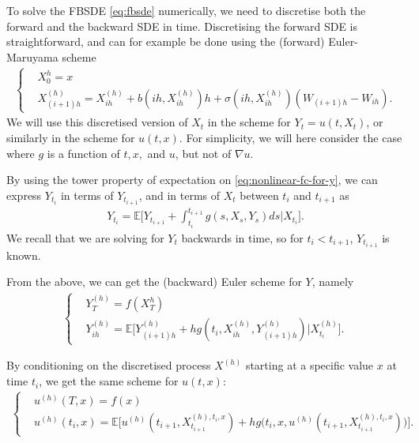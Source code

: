 \documentclass{article}  %
\begin{document}
To solve the FBSDE \autoref{eq:fbsde} numerically, we need to discretise both the forward and the backward SDE in time. Discretising the forward SDE is straightforward, and can for example be done using the (forward) Euler-Maruyama scheme
%
\begin{align} 
    \begin{cases}
    &X_0^{h} = x\\
    &X_{(i+1)h}^{(h)} = X_{ih}^{(h)} + b(ih,X_{ih}^{(h)}) h + \sigma(ih,X_{ih}^{(h)})(W_{(i+1)h}-W_{ih}).
    \end{cases}
\end{align}
%
We will use this discretised version of $X_t$ in the scheme for $Y_t=u(t,X_t)$, or similarly in the scheme for $u(t,x)$. For simplicity, we will here consider the case where $g$ is a function of $t,x,$ and $u$, but not of $\nabla u$.

By using the tower property of expectation on \autoref{eq:nonlinear-fc-for-y}, we can express $Y_{t_i}$ in terms of $Y_{t_{i+1}}$, and in terms of $X_t$ between $t_i$ and $t_{i+1}$ as
%
\begin{align} 
    Y_{t_i} = \mathbb{E}\bigg[ Y_{t_{i+1}} + \int_{t_{i}}^{t_{i+1}}g(s,X_s,Y_s)ds \Big\lvert X_{t_i} \bigg].
\end{align}
%
We recall that we are solving for $Y_t$ backwards in time, so for $t_i < t_{i+1}$, $Y_{t_{i+1}}$ is known.

From the above, we can get the (backward) Euler scheme for $Y$, namely
%
\begin{align} %
    \begin{cases}
    &Y_T^{(h)} = f(X_T^{h})\\
    &Y_{ih}^{(h)} = \mathbb{E}\bigg[ Y_{(i+1)h}^{(h)} + h g(t_i,X_{ih}^{(h)},Y_{(i+1)h}^{(h)}) \Big\lvert X_{t_i}^{(h)} \bigg].
    \end{cases}
\end{align}
%

By conditioning on the discretised process $X^{(h)}$ starting at a specific value $x$ at time $t_i$, we get the same scheme for $u(t,x)$:
%
\begin{align}
    \begin{cases}
    &u^{(h)}(T,x) = f(x)\\
    &u^{(h)}(t_i,x) = \mathbb{E}\bigg[ u^{(h)}(t_{i+1},X^{(h),t_i,x}_{t_{i+1}}) + h g\big( t_i,x,u^{(h)}(t_{i+1},X^{(h),t_i,x}_{t_{i+1}}) \big) \bigg]. 
    \end{cases}
\end{align} 
%
\end{document}
